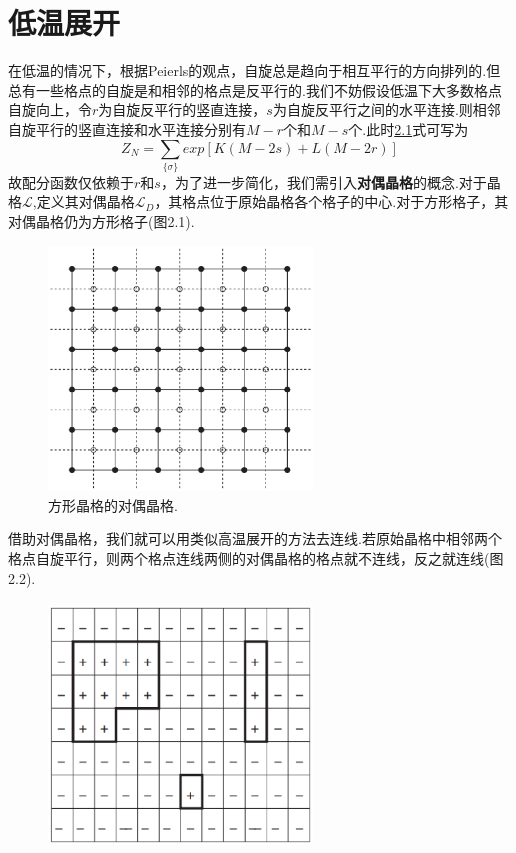 \documentclass[a4paper]{book}
\begin{document}
\section{低温展开}
在低温的情况下，根据Peierls的观点，自旋总是趋向于相互平行的方向排列的.但总有一些格点的自旋是和相邻的格点是反平行的.我们不妨假设低温下大多数格点自旋向上，令$r$为自旋反平行的竖直连接，$s$为自旋反平行之间的水平连接.则相邻自旋平行的竖直连接和水平连接分别有$M-r$个和$M-s$个.此时\hyperref[2.1]{2.1}式可写为
\begin{equation}\label{2.10}
	Z_N=\sum_{\{\sigma\}}exp[K(M-2s)+L(M-2r)]
\end{equation}
故配分函数仅依赖于$r$和$s$，为了进一步简化，我们需引入\textbf{对偶晶格}的概念.对于晶格$\mathcal{L}$,定义其对偶晶格$\mathcal{L}_D$，其格点位于原始晶格各个格子的中心.对于方形格子，其对偶晶格仍为方形格子(图2.1).
 \begin{figure}[!h]
	\centering
	\includegraphics[width=7cm,height=6.5cm]{figures/2.eps}
	\caption{方形晶格的对偶晶格.}
\end{figure}
借助对偶晶格，我们就可以用类似高温展开的方法去连线.若原始晶格中相邻两个格点自旋平行，则两个格点连线两侧的对偶晶格的格点就不连线，反之就连线(图2.2).
 \begin{figure}[!h]
	\centering
	\includegraphics[width=7cm,height=6.5cm]{figures/3.eps}
	\caption{}
\end{figure}
\end{document}
